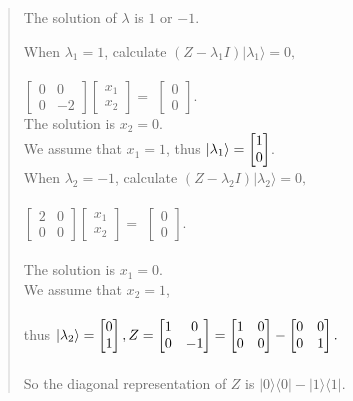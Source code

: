 \documentclass[UTF8]{ctexart}
\begin{document}
\begin{quote}
	The solution of $\lambda$ is $1$ or $-1$.
	
	When $\lambda_{1}=1$, calculate
    	$(Z-\lambda_{1} I)|\lambda_{1}\rangle=0,$ \\  \\ 
	$\begin{bmatrix}0&0\\0&-2\end{bmatrix}\begin{bmatrix}x_{1}\\x_{2}\end{bmatrix}=$
	$\begin{bmatrix}0\\0\end{bmatrix}$. \\  
	
	The solution is $x_{2}=0$. \\
	We  assume that $x_{1}=1$,
	thus $\ket{\lambda_{1}}=\begin{bmatrix}1\\0\end{bmatrix}$. 
	\\
	When $\lambda_{2}=-1$, calculate
    	$(Z-\lambda_{2} I )|\lambda_{2}\rangle=0,$ \\  \\
	$\begin{bmatrix}2&0\\0&0\end{bmatrix}\begin{bmatrix}x_{1}\\x_{2}\end{bmatrix}=$
	$\begin{bmatrix}0\\0\end{bmatrix}$. \\  \\ 
	The solution is $x_{1}=0$.\\
	We  assume that $x_{2}=1$,  \\ 
	\\
	thus $\ket{\lambda_{2}}=\begin{bmatrix}0\\1\end{bmatrix},
	 Z=\begin{bmatrix}1&0\\0&-1\end{bmatrix} 
	=\begin{bmatrix}1&0\\0&0\end{bmatrix}-\begin{bmatrix}0&0\\0&\-1\end{bmatrix}.$ \\ \\
	So the diagonal representation of $Z$ is $|0\rangle\langle 0 |-|1\rangle\langle 1|.$ \\  	
	

\end{quote}
\end{document}
